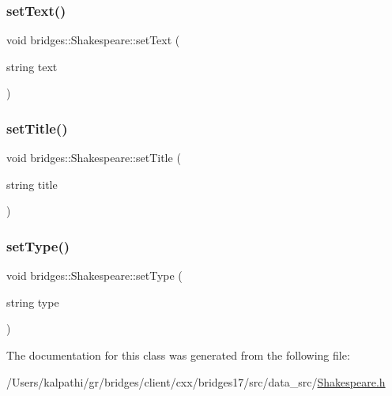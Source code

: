 \mbox{\label{classbridges_1_1_shakespeare_a58e8cb2a96ce9af45fcf963694a3aba7}} 
\subsubsection{\texorpdfstring{set\+Text()}{setText()}}
{\footnotesize\ttfamily void bridges\+::\+Shakespeare\+::set\+Text (\begin{DoxyParamCaption}\item[{string}]{text }\end{DoxyParamCaption})\hspace{0.3cm}{\ttfamily [inline]}}

\mbox{\label{classbridges_1_1_shakespeare_a533ff5a5dd8681ab1156c7345f85ad82}} 
\subsubsection{\texorpdfstring{set\+Title()}{setTitle()}}
{\footnotesize\ttfamily void bridges\+::\+Shakespeare\+::set\+Title (\begin{DoxyParamCaption}\item[{string}]{title }\end{DoxyParamCaption})\hspace{0.3cm}{\ttfamily [inline]}}

\mbox{\label{classbridges_1_1_shakespeare_a2bc1ebcfa8b28a590a1f6f83e26ce051}} 
\subsubsection{\texorpdfstring{set\+Type()}{setType()}}
{\footnotesize\ttfamily void bridges\+::\+Shakespeare\+::set\+Type (\begin{DoxyParamCaption}\item[{string}]{type }\end{DoxyParamCaption})\hspace{0.3cm}{\ttfamily [inline]}}



The documentation for this class was generated from the following file\+:\begin{DoxyCompactItemize}
\item 
/\+Users/kalpathi/gr/bridges/client/cxx/bridges17/src/data\+\_\+src/\mbox{\hyperlink{_shakespeare_8h}{Shakespeare.\+h}}\end{DoxyCompactItemize}

